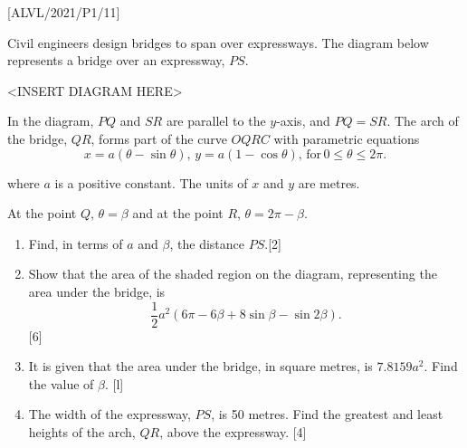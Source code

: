 \item {[}ALVL/2021/P1/11{]}

Civil engineers design bridges to span over expressways. The diagram
below represents a bridge over an expressway, $PS$. 
\noindent \begin{center}
<INSERT DIAGRAM HERE>
\par\end{center}

In the diagram, $PQ$ and $SR$ are parallel to the $y$-axis, and
$PQ=SR$. The arch of the bridge, $QR$, forms part of the curve $OQRC$
with parametric equations 
\[
x=a\left(\theta-\sin\theta\right),\,y=a\left(1-\cos\theta\right),\,\text{for}\,0\leq\theta\leq2\pi.
\]

where $a$ is a positive constant. The units of $x$ and $y$ are
metres. 

At the point $Q$, $\theta=\beta$ and at the point $R$, $\theta=2\pi-\beta$. 
\begin{enumerate}
\item Find, in terms of $a$ and $\beta$, the distance $PS$.\hfill{}{[}2{]}
\item Show that the area of the shaded region on the diagram, representing
the area under the bridge, is 
\[
\frac{1}{2}a^{2}\left(6\pi-6\beta+8\sin\beta-\sin2\beta\right).
\]
\hfill{} {[}6{]}
\item It is given that the area under the bridge, in square metres, is $7.8159a^{2}$.
Find the value of $\beta$. \hfill{}{[}l{]}
\item The width of the expressway, $PS$, is 50 metres. Find the greatest
and least heights of the arch, $QR$, above the expressway. \hfill{}{[}4{]}
\end{enumerate}

